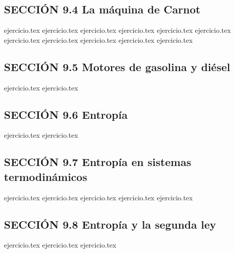 \subsection*{SECCIÓN 9.4 La máquina de Carnot}
\begin{enumerate}
    \setcounter{enumi}{6}
    {ejercicio.tex}
    {ejercicio.tex}
    {ejercicio.tex}
    {ejercicio.tex}
    {ejercicio.tex}
    {ejercicio.tex}
    {ejercicio.tex}
    {ejercicio.tex}
    {ejercicio.tex}
    {ejercicio.tex}
    {ejercicio.tex}
\end{enumerate}

\subsection*{SECCIÓN 9.5 Motores de gasolina y diésel}
\begin{enumerate}
    \setcounter{enumi}{17}
    {ejercicio.tex}
    {ejercicio.tex}
\end{enumerate}

\subsection*{SECCIÓN 9.6 Entropía}
\begin{enumerate}
    \setcounter{enumi}{19}
    {ejercicio.tex}
    {ejercicio.tex}
\end{enumerate}

\subsection*{SECCIÓN 9.7 Entropía en sistemas termodinámicos}
\begin{enumerate}
    \setcounter{enumi}{21}
    {ejercicio.tex}
    {ejercicio.tex}
    {ejercicio.tex}
    {ejercicio.tex}
    {ejercicio.tex}
\end{enumerate}

\subsection*{SECCIÓN 9.8 Entropía y la segunda ley}
\begin{enumerate}
    \setcounter{enumi}{26}
    {ejercicio.tex}
    {ejercicio.tex}
    {ejercicio.tex}
\end{enumerate}

